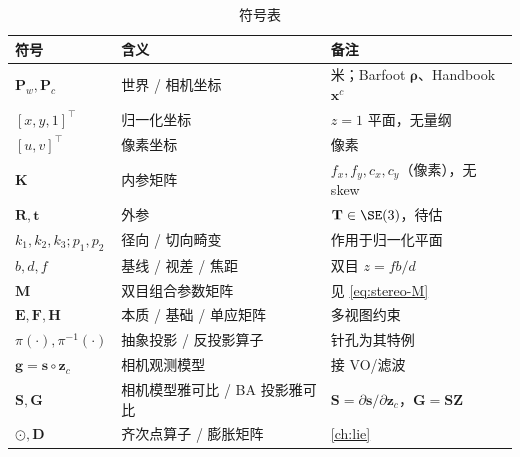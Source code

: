 \begin{table}[H]\centering\small
\caption{符号表}
\begin{tabular}{lll}
\toprule
符号 & 含义 & 备注 \\
\midrule
$\mathbf{P}_w,\mathbf{P}_c$ & 世界 / 相机坐标 & 米；Barfoot $\boldsymbol\rho$、Handbook $\mathbf{x}^c$ \\
$[x,y,1]^\top$ & 归一化坐标 & $z=1$ 平面，无量纲 \\
$[u,v]^\top$ & 像素坐标 & 像素 \\
$\mathbf{K}$ & 内参矩阵 & $f_x,f_y,c_x,c_y$（像素），无 skew \\
$\mathbf{R},\mathbf{t}$ & 外参 & $\mathbf{T}\in\SE(3)$，待估 \\
$k_1,k_2,k_3;p_1,p_2$ & 径向 / 切向畸变 & 作用于归一化平面 \\
$b,d,f$ & 基线 / 视差 / 焦距 & 双目 $z=fb/d$ \\
$\mathbf{M}$ & 双目组合参数矩阵 & 见 \cref{eq:stereo-M} \\
$\mathbf{E},\mathbf{F},\mathbf{H}$ & 本质 / 基础 / 单应矩阵 & 多视图约束 \\
$\pi(\cdot),\pi^{-1}(\cdot)$ & 抽象投影 / 反投影算子 & 针孔为其特例 \\
$\mathbf{g}=\mathbf{s}\circ\mathbf{z}_c$ & 相机观测模型 & 接 VO/滤波 \\
$\mathbf{S},\mathbf{G}$ & 相机模型雅可比 / BA 投影雅可比 & $\mathbf{S}=\partial\mathbf{s}/\partial\mathbf{z}_c$，$\mathbf{G}=\mathbf{S}\mathbf{Z}$ \\
$\odot,\mathbf{D}$ & 齐次点算子 / 膨胀矩阵 & \cref{ch:lie} \\
\bottomrule
\end{tabular}
\end{table}

